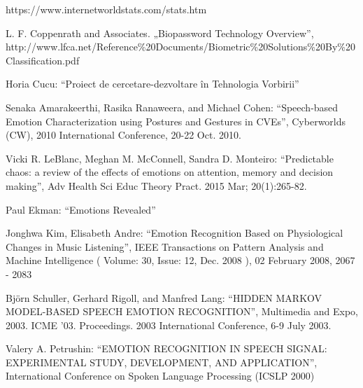 \documentclass[9pt,shortpaper,twoside,web]{ieeecolor}
\begin{document}
\begin{thebibliography}{00}

 https://www.internetworldstats.com/stats.htm

 L. F. Coppenrath and Associates. „Biopassword Technology Overview”, http://www.lfca.net/Reference\%20Documents/Biometric\%20Solutions\%20By\%20Classification.pdf

 Horia Cucu: ``Proiect de cercetare-dezvoltare în Tehnologia Vorbirii''

 Senaka Amarakeerthi, Rasika Ranaweera, and Michael Cohen: ``Speech-based Emotion Characterization using Postures and Gestures in CVEs'', Cyberworlds (CW), 2010 International Conference, 20-22 Oct. 2010.

 Vicki R. LeBlanc, Meghan M. McConnell, Sandra D. Monteiro: ``Predictable chaos: a review of the effects of emotions on attention, memory and decision making'', Adv Health Sci Educ Theory Pract. 2015 Mar; 20(1):265-82.

 Paul Ekman: ``Emotions Revealed''

 Jonghwa Kim, Elisabeth Andre: ``Emotion Recognition Based on Physiological Changes in Music Listening'',  IEEE Transactions on Pattern Analysis and Machine Intelligence ( Volume: 30, Issue: 12, Dec. 2008 ), 02 February 2008, 2067 - 2083

 Björn Schuller, Gerhard Rigoll, and Manfred Lang: ``HIDDEN MARKOV MODEL-BASED SPEECH EMOTION RECOGNITION'', Multimedia and Expo, 2003. ICME '03. Proceedings. 2003 International Conference,  6-9 July 2003.

 Valery A. Petrushin: ``EMOTION RECOGNITION IN SPEECH SIGNAL:
EXPERIMENTAL STUDY, DEVELOPMENT, AND APPLICATION'', International Conference on Spoken Language Processing (ICSLP 2000)

\end{thebibliography}
\end{document}
